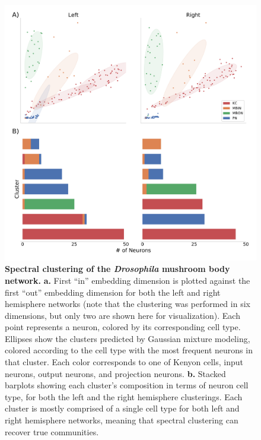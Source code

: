 \begin{figure}
    \centering
    \includegraphics[width = .8\linewidth]{figures/dnd/mb-clustering.pdf}
    \caption{\textbf{Spectral clustering of the \textit{Drosophila} mushroom body network.} \textbf{a.} First ``in'' embedding dimension is plotted against the first ``out'' embedding dimension for both the left and right hemisphere networks (note that the clustering was performed in six dimensions, but only two are shown here for visualization). Each point represents a neuron, colored by its corresponding cell type. Ellipses show the clusters predicted by Gaussian mixture modeling, colored according to the cell type with the most frequent neurons in that cluster. Each color corresponds to one of Kenyon cells, input neurons, output neurons, and projection neurons. \textbf{b.} Stacked barplots showing each cluster's composition in terms of neuron cell type, for both the left and the right hemisphere clusterings. Each cluster is mostly comprised of a single cell type for both left and right hemisphere networks, meaning that spectral clustering can recover true communities. }
    \label{fig:mb-clustering}
\end{figure}

